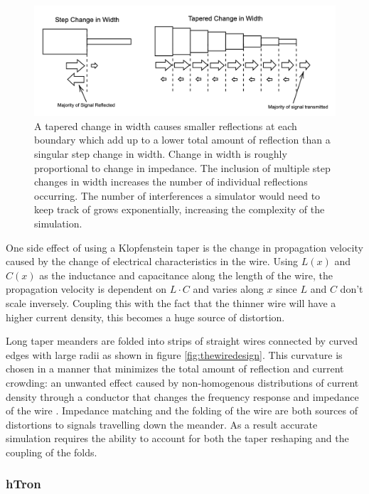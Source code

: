 \begin{figure}[h]
  \centering
  \includegraphics[width=5in]{figs/whatsataper.png}
  
  \caption{A tapered change in width causes smaller reflections at each boundary which add up to a lower total amount of reflection than a singular step change in width. Change in width is roughly proportional to change in impedance. The inclusion of multiple step changes in
  width increases the number of individual reflections occurring. 
  The number of interferences a simulator would need to keep track of grows 
  exponentially, increasing the complexity of the simulation.}
 \label{fig:whatsataper}
\end{figure}

One side effect of using a Klopfenstein taper is the change in propagation velocity 
caused by the change of electrical characteristics in the wire. Using $L(x)$ and $C(x)$ 
as the inductance and capacitance along the length of the wire, 
the propagation velocity is dependent on $L\cdot C$ and varies along $x$ since 
$L$ and $C$ don't scale inversely. Coupling this with the fact that the thinner wire will 
have a higher current density, this becomes a huge source of distortion.

Long taper meanders are folded into strips of straight wires connected by curved edges with 
large radii as shown in figure \ref{fig:thewiredesign}. This curvature is chosen in a manner that minimizes the total amount of reflection
and current crowding: an unwanted effect caused by non-homogenous distributions 
of current density through a conductor that changes the frequency response and impedance 
of the wire \cite{Akhlaghi:12}. Impedance matching and the folding of 
the wire are both sources of distortions
to signals travelling down the meander. As a result accurate simulation requires the ability to account for both the taper reshaping and the coupling of the folds.

\subsubsection{hTron}

